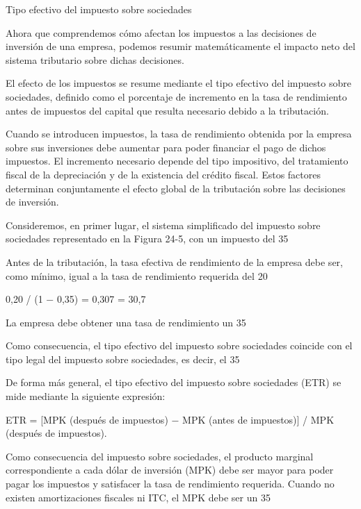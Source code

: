 \documentclass[10pt,a4paper]{article}
\begin{document}
Tipo efectivo del impuesto sobre sociedades

Ahora que comprendemos cómo afectan los impuestos a las decisiones de inversión de una empresa, podemos resumir matemáticamente el impacto neto del sistema tributario sobre dichas decisiones.

El efecto de los impuestos se resume mediante el tipo efectivo del impuesto sobre sociedades, definido como el porcentaje de incremento en la tasa de rendimiento antes de impuestos del capital que resulta necesario debido a la tributación.

Cuando se introducen impuestos, la tasa de rendimiento obtenida por la empresa sobre sus inversiones debe aumentar para poder financiar el pago de dichos impuestos. El incremento necesario depende del tipo impositivo, del tratamiento fiscal de la depreciación y de la existencia del crédito fiscal. Estos factores determinan conjuntamente el efecto global de la tributación sobre las decisiones de inversión.

Consideremos, en primer lugar, el sistema simplificado del impuesto sobre sociedades representado en la Figura 24-5, con un impuesto del 35 %

Antes de la tributación, la tasa efectiva de rendimiento de la empresa debe ser, como mínimo, igual a la tasa de rendimiento requerida del 20 %

0,20 / (1 − 0,35) = 0,307 = 30,7 %

La empresa debe obtener una tasa de rendimiento un 35 %

Como consecuencia, el tipo efectivo del impuesto sobre sociedades coincide con el tipo legal del impuesto sobre sociedades, es decir, el 35 %

De forma más general, el tipo efectivo del impuesto sobre sociedades (ETR) se mide mediante la siguiente expresión:

ETR = [MPK (después de impuestos) − MPK (antes de impuestos)] / MPK (después de impuestos).

Como consecuencia del impuesto sobre sociedades, el producto marginal correspondiente a cada dólar de inversión (MPK) debe ser mayor para poder pagar los impuestos y satisfacer la tasa de rendimiento requerida. Cuando no existen amortizaciones fiscales ni ITC, el MPK debe ser un 35 %
\end{document}
